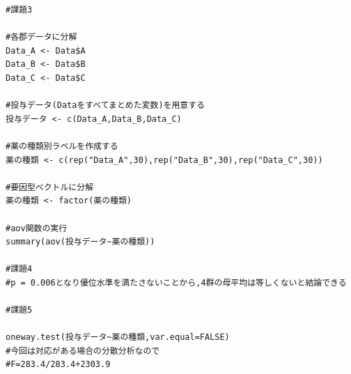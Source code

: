 \documentclass[fontsize = 10pt, paper= a4,twocolumn,column_gap=5zw]{jlreq}
\begin{document}
\begin{lstlisting}[basicstyle=\ttfamily\footnotesize, frame=single, caption=s2212022-1.c ,label=s2212022-1.c]
#課題3

#各郡データに分解
Data_A <- Data$A
Data_B <- Data$B 
Data_C <- Data$C

#投与データ(Dataをすべてまとめた変数)を用意する
投与データ <- c(Data_A,Data_B,Data_C)

#薬の種類別ラベルを作成する
薬の種類 <- c(rep("Data_A",30),rep("Data_B",30),rep("Data_C",30))

#要因型ベクトルに分解
薬の種類 <- factor(薬の種類)

#aov関数の実行
summary(aov(投与データ~薬の種類))

#課題4
#p = 0.006となり優位水準を満たさないことから,4群の母平均は等しくないと結論できる

#課題5

oneway.test(投与データ~薬の種類,var.equal=FALSE)
#今回は対応がある場合の分散分析なので
#F=283.4/283.4+2303.9
    \end{lstlisting}
\end{document}
